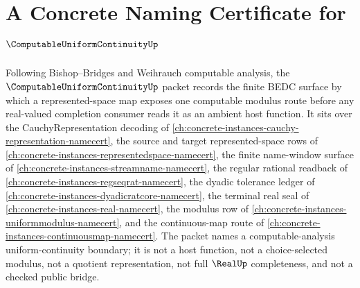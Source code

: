 \chapter{A Concrete Naming Certificate for $\ComputableUniformContinuityUp$}
\label{ch:concrete-instances-computable-uniform-continuity-namecert}

Following Bishop--Bridges and Weihrauch computable analysis, the $\ComputableUniformContinuityUp$ packet records the finite BEDC surface by which a represented-space map exposes one computable modulus route before any real-valued completion consumer reads it as an ambient host function. It sits over the CauchyRepresentation decoding of \autoref{ch:concrete-instances-cauchy-representation-namecert}, the source and target represented-space rows of \autoref{ch:concrete-instances-representedspace-namecert}, the finite name-window surface of \autoref{ch:concrete-instances-streamname-namecert}, the regular rational readback of \autoref{ch:concrete-instances-regseqrat-namecert}, the dyadic tolerance ledger of \autoref{ch:concrete-instances-dyadicratcore-namecert}, the terminal real seal of \autoref{ch:concrete-instances-real-namecert}, the modulus row of \autoref{ch:concrete-instances-uniformmodulus-namecert}, and the continuous-map route of \autoref{ch:concrete-instances-continuousmap-namecert}. The packet names a computable-analysis uniform-continuity boundary; it is not a host function, not a choice-selected modulus, not a quotient representation, not full $\RealUp$ completeness, and not a checked public bridge.

